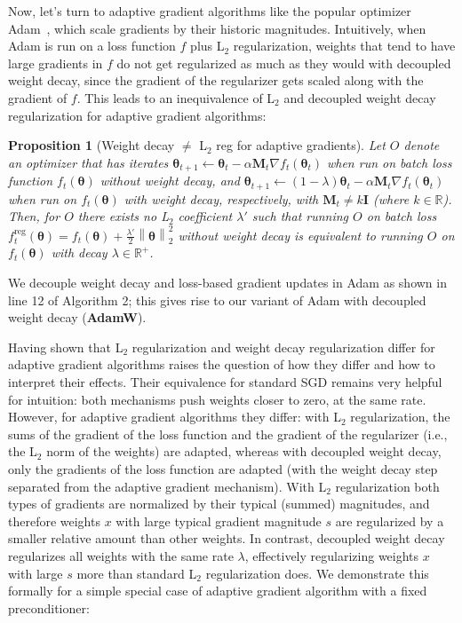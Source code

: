 \documentclass[usenames,dvipsnames]{article}
\newcommand{\norm}[1]{\left\lVert#1\right\rVert}
\newtheorem{prop}{Proposition}
\begin{document}
Now, let's turn to adaptive gradient algorithms like the popular optimizer Adam~\cite{kingma2014adam}, which scale gradients by their historic magnitudes. Intuitively, when Adam is run on a loss function $f$ plus L$_2$ regularization, weights that tend to have large gradients in $f$ do not get regularized as much as they would with decoupled weight decay, since the gradient of the regularizer gets scaled along with the gradient of $f$.
This leads to an inequivalence of L$_2$ and decoupled weight decay regularization for adaptive gradient algorithms:

\begin{prop}[Weight decay $\neq$ L$_2$ reg for adaptive gradients] Let $O$ denote an optimizer that has iterates $\bm{\theta}_{t+1} \leftarrow \bm{\theta}_t - \alpha \mathbf{M}_t \nabla f_t(\bm{\theta}_t)$ when run on batch loss function $f_t(\bm{\theta})$ \emph{without} weight decay, and 
$\bm{\theta}_{t+1} \leftarrow (1 - \lambda) \bm{\theta}_t - \alpha \mathbf{M}_t \nabla f_t(\bm{\theta}_t)$ when run on $f_t(\bm{\theta})$ \emph{with} weight decay, respectively, with $\mathbf{M}_t \neq k \mathbf{I}$ (where $k\in\mathbb{R}$). 
Then, for $O$ there exists no L$_2$ coefficient $\lambda'$ such that running $O$ on batch loss $f^{\text{reg}}_t(\bm{\theta}) = f_t(\bm{\theta}) + \frac{\lambda'}{2} \norm{\bm{\theta}}_2^2$ without weight decay is equivalent to running $O$ on $f_t(\bm{\theta})$ with decay $\lambda\in\mathbb{R}^+$. 
\end{prop}

We decouple weight decay and loss-based gradient updates in Adam as shown in line 12 of Algorithm 2; this gives rise to our variant of Adam with decoupled weight decay (\textbf{AdamW}). 

Having shown that L$_2$ regularization and weight decay regularization differ for adaptive gradient algorithms raises the question of how they differ and how to interpret their effects. 
Their equivalence for standard SGD remains very helpful for intuition: both mechanisms push weights closer to zero, at the same rate.
However, for adaptive gradient algorithms they differ: with L$_2$  regularization, the sums of the gradient of the loss function and the gradient of the regularizer (i.e., the L$_2$  norm of the weights) are adapted, whereas with decoupled weight decay, only the gradients of the loss function are adapted (with the weight decay step separated from the adaptive gradient mechanism).
With L$_2$ regularization both types of gradients are normalized by their typical (summed) magnitudes, and therefore weights $x$ with large typical gradient magnitude $s$ are regularized by a smaller relative amount than other weights.
In contrast, decoupled weight decay regularizes all weights with the same rate $\lambda$, effectively regularizing weights $x$ with large $s$ more than standard L$_2$ regularization does.
We demonstrate this formally for a simple special case of adaptive gradient algorithm with a fixed preconditioner:
\end{document}
